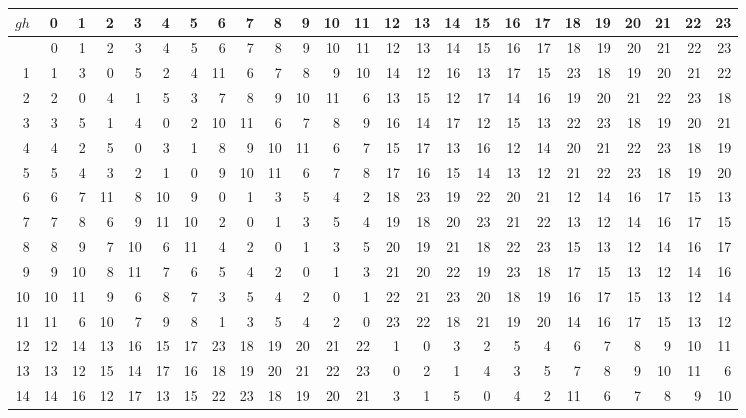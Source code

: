 \documentclass[10pt,a4paper]{article}
\numberwithin{equation}{section}
\begin{document}
{\normalsize\setlength{\tabcolsep}{0.1em}\setlength{\LTleft}{-8pt plus 1fill}\setlength{\LTright}{-8pt plus 1fill}\begin{longtable}{@{}r|rrrrrrrrrrrrrrrrrrrrrrrr@{}}\toprule
$gh$ & 0 & 1 & 2 & 3 & 4 & 5 & 6 & 7 & 8 & 9 & 10 & 11 & 12 & 13 & 14 & 15 & 16 & 17 & 18 & 19 & 20 & 21 & 22 & 23\\\midrule\endhead
\bottomrule\endfoot\endlastfoot
0 & 0 & 1 & 2 & 3 & 4 & 5 & 6 & 7 & 8 & 9 & 10 & 11 & 12 & 13 & 14 & 15 & 16 & 17 & 18 & 19 & 20 & 21 & 22 & 23\\*
1 & 1 & 3 & 0 & 5 & 2 & 4 & 11 & 6 & 7 & 8 & 9 & 10 & 14 & 12 & 16 & 13 & 17 & 15 & 23 & 18 & 19 & 20 & 21 & 22\\
2 & 2 & 0 & 4 & 1 & 5 & 3 & 7 & 8 & 9 & 10 & 11 & 6 & 13 & 15 & 12 & 17 & 14 & 16 & 19 & 20 & 21 & 22 & 23 & 18\\
3 & 3 & 5 & 1 & 4 & 0 & 2 & 10 & 11 & 6 & 7 & 8 & 9 & 16 & 14 & 17 & 12 & 15 & 13 & 22 & 23 & 18 & 19 & 20 & 21\\
4 & 4 & 2 & 5 & 0 & 3 & 1 & 8 & 9 & 10 & 11 & 6 & 7 & 15 & 17 & 13 & 16 & 12 & 14 & 20 & 21 & 22 & 23 & 18 & 19\\
5 & 5 & 4 & 3 & 2 & 1 & 0 & 9 & 10 & 11 & 6 & 7 & 8 & 17 & 16 & 15 & 14 & 13 & 12 & 21 & 22 & 23 & 18 & 19 & 20\\
6 & 6 & 7 & 11 & 8 & 10 & 9 & 0 & 1 & 3 & 5 & 4 & 2 & 18 & 23 & 19 & 22 & 20 & 21 & 12 & 14 & 16 & 17 & 15 & 13\\
7 & 7 & 8 & 6 & 9 & 11 & 10 & 2 & 0 & 1 & 3 & 5 & 4 & 19 & 18 & 20 & 23 & 21 & 22 & 13 & 12 & 14 & 16 & 17 & 15\\
8 & 8 & 9 & 7 & 10 & 6 & 11 & 4 & 2 & 0 & 1 & 3 & 5 & 20 & 19 & 21 & 18 & 22 & 23 & 15 & 13 & 12 & 14 & 16 & 17\\
9 & 9 & 10 & 8 & 11 & 7 & 6 & 5 & 4 & 2 & 0 & 1 & 3 & 21 & 20 & 22 & 19 & 23 & 18 & 17 & 15 & 13 & 12 & 14 & 16\\
10 & 10 & 11 & 9 & 6 & 8 & 7 & 3 & 5 & 4 & 2 & 0 & 1 & 22 & 21 & 23 & 20 & 18 & 19 & 16 & 17 & 15 & 13 & 12 & 14\\
11 & 11 & 6 & 10 & 7 & 9 & 8 & 1 & 3 & 5 & 4 & 2 & 0 & 23 & 22 & 18 & 21 & 19 & 20 & 14 & 16 & 17 & 15 & 13 & 12\\
12 & 12 & 14 & 13 & 16 & 15 & 17 & 23 & 18 & 19 & 20 & 21 & 22 & 1 & 0 & 3 & 2 & 5 & 4 & 6 & 7 & 8 & 9 & 10 & 11\\
13 & 13 & 12 & 15 & 14 & 17 & 16 & 18 & 19 & 20 & 21 & 22 & 23 & 0 & 2 & 1 & 4 & 3 & 5 & 7 & 8 & 9 & 10 & 11 & 6\\
14 & 14 & 16 & 12 & 17 & 13 & 15 & 22 & 23 & 18 & 19 & 20 & 21 & 3 & 1 & 5 & 0 & 4 & 2 & 11 & 6 & 7 & 8 & 9 & 10\\

\end{longtable}}
\end{document}

